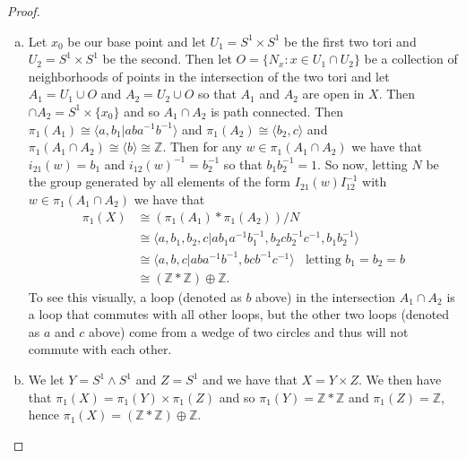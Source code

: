 \documentclass[leqno]{article}
\theoremstyle{nonumberplain}
\newtheorem{proof}{Proof}
\newcommand{\Z}{\mathbb{Z}}
\begin{document}
\begin{proof}~
\begin{enumerate}[(a)]
\item Let $x_0$ be our base point and let $U_1=S^1\times S^1$ be the first two tori and $U_2=S^1 \times S^1$ be the second. Then let $O=\{N_x \colon x\in U_1 \cap U_2\}$ be a collection of neighborhoods of points in the intersection of the two tori and let $A_1=U_1\cup O$ and $A_2=U_2 \cup O$ so that $A_1$ and $A_2$ are open in $X$. Then  $\cap A_2 = S^1 \times \{x_0\}$ and so $A_1\cap A_2$ is path connected.  Then $\pi_1 (A_1)\cong \langle a,b_1 \vert aba^{-1}b^{-1} \rangle$ and $\pi_1 (A_2) \cong \langle b_2,c \rangle$ and $\pi_1(A_1\cap A_2)\cong \langle b \rangle \cong \Z$.  Then for any $w\in \pi_1(A_1 \cap A_2)$ we have that $i_{21}(w)=b_1$ and $i_{12}(w)^{-1}=b_2^{-1}$ so that $b_1b_2^{-1}=1$.  So now, letting $N$ be the group generated by all elements of the form $I_{21}(w)I_{12}^{-1}$ with $w\in \pi_1(A_1\cap A_2)$ we have that 
\begin{align*}
\pi_1(X) &\cong (\pi_1(A_1)\ast \pi_1(A_2))/N \\
&\cong \langle a,b_1,b_2,c \vert ab_1a^{-1}b_1^{-1}, b_2cb_2^{-1}c^{-1}, b_1b_2^{-1} \rangle \\
& \cong \langle a,b,c \vert aba^{-1}b^{-1}, bcb^{-1}c^{-1} \rangle ~~~~ \textrm{letting $b_1=b_2=b$}\\
&\cong (\Z \ast \Z) \oplus \Z.
\end{align*}
To see this visually, a loop (denoted as $b$ above) in the intersection $A_1 \cap A_2$ is a loop that commutes with all other loops, but the other two loops (denoted as $a$ and $c$ above) come from a wedge of two circles and thus will not commute with each other.

\item We let $Y=S^1 \wedge S^1$ and $Z=S^1$ and we have that $X=Y\times Z$.  We then have that $\pi_1(X)=\pi_1(Y)\times \pi_1(Z)$ and so $\pi_1(Y)=\Z\ast \Z$ and $\pi_1(Z)=\Z$, hence $\pi_1(X)=(\Z\ast \Z) \oplus \Z$.
\end{enumerate}
\end{proof}
\end{document}
